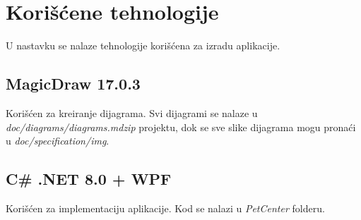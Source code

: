 \section{Korišćene tehnologije}
\par U nastavku se nalaze tehnologije korišćena za izradu aplikacije.
\subsection{MagicDraw 17.0.3}
\par Korišćen za kreiranje dijagrama. Svi dijagrami se nalaze u \textit{doc/diagrams/dia\-grams.mdzip} projektu, dok se sve slike dijagrama mogu pronaći u 
\textit{doc/spe\-cification/img}.
\subsection{C\# .NET 8.0 + WPF}
\par Korišćen za implementaciju aplikacije. Kod se nalazi u \textit{PetCenter} folderu.